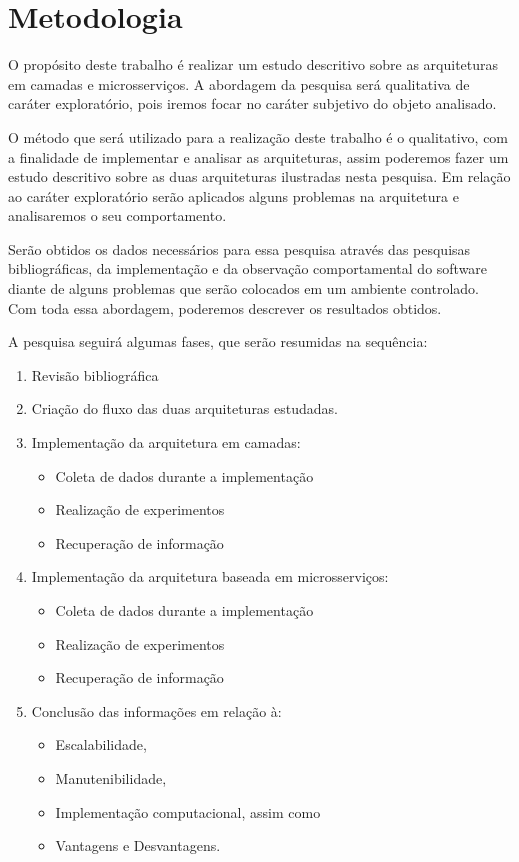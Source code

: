 
\chapter{Metodologia}\label{cap3}

O propósito deste trabalho é realizar um estudo descritivo sobre as arquiteturas em camadas e microsserviços. A abordagem da pesquisa será qualitativa de caráter exploratório, pois iremos focar no caráter subjetivo do objeto analisado. 

O método que será utilizado para a realização deste trabalho é o qualitativo, com a finalidade de implementar e analisar as arquiteturas, assim poderemos fazer um estudo descritivo sobre as duas arquiteturas ilustradas nesta pesquisa. Em relação ao caráter exploratório serão aplicados alguns problemas na arquitetura e analisaremos o seu comportamento.

Serão obtidos os dados necessários para essa pesquisa através das pesquisas bibliográficas, da implementação e da observação comportamental do software diante de alguns problemas que serão colocados em um ambiente controlado. Com toda essa abordagem, poderemos descrever os resultados obtidos.

A pesquisa seguirá algumas fases, que serão resumidas na sequência: 
\begin{enumerate}
    \item Revisão bibliográfica
    \item Criação do fluxo das duas arquiteturas estudadas.
    \item Implementação da arquitetura em camadas:
    \begin{itemize}
        \item Coleta de dados durante a implementação
        \item Realização de experimentos
        \item Recuperação de informação
    \end{itemize}
    
    \item  Implementação da arquitetura baseada em microsserviços:
        \begin{itemize}
        \item Coleta de dados durante a implementação
        \item Realização de experimentos
        \item Recuperação de informação
    \end{itemize}
    \item Conclusão das informações em relação à: 
    \begin{itemize}
        \item Escalabilidade, 
        \item Manutenibilidade, 
        \item Implementação computacional, assim como
        \item Vantagens e Desvantagens.
    \end{itemize}
    
\end{enumerate}

